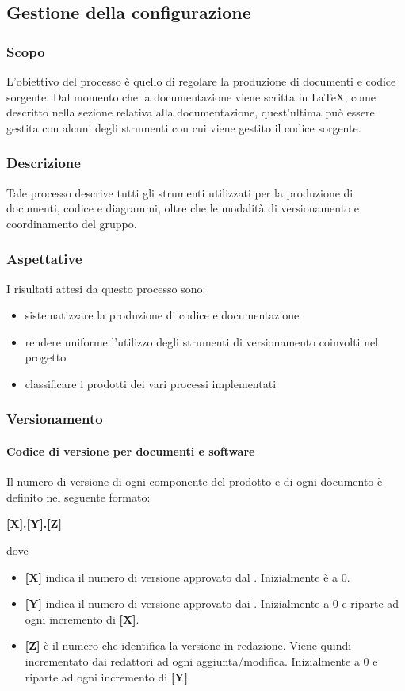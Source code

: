\subsection{Gestione della configurazione}
\subsubsection{Scopo}
L'obiettivo del processo è quello di regolare la produzione di documenti e codice sorgente.
Dal momento che la documentazione viene scritta in \LaTeX, come descritto nella sezione relativa
alla documentazione, quest'ultima può essere gestita con alcuni degli strumenti con
cui viene gestito il codice sorgente.

\subsubsection{Descrizione}
Tale processo descrive tutti gli strumenti utilizzati per la produzione di documenti, codice e diagrammi,
oltre che le modalità di versionamento e coordinamento del gruppo.

\subsubsection{Aspettative}
I risultati attesi da questo processo sono:
\begin{itemize}
    \item sistematizzare la produzione di codice e documentazione
    \item rendere uniforme l'utilizzo degli strumenti di versionamento coinvolti nel progetto
    \item classificare i prodotti dei vari processi implementati
\end{itemize}

\subsubsection{Versionamento}
\paragraph{Codice di versione per documenti e software}
Il numero di versione di ogni componente del prodotto e di ogni documento è definito nel seguente formato:
\begin{center}
    \textbf{[X].[Y].[Z]}
\end{center}
dove
\begin{itemize}
    \item \textbf{[X]} indica il numero di versione approvato dal . Inizialmente è a 0.
    \item \textbf{[Y]} indica il numero di versione approvato dai . Inizialmente a 0 e riparte ad ogni
                       incremento di \textbf{[X]}.
    \item \textbf{[Z]} è il numero che identifica la versione in redazione. Viene quindi incrementato dai redattori
                       ad ogni aggiunta/modifica. Inizialmente a 0 e riparte ad ogni incremento di \textbf{[Y]}
\end{itemize}

